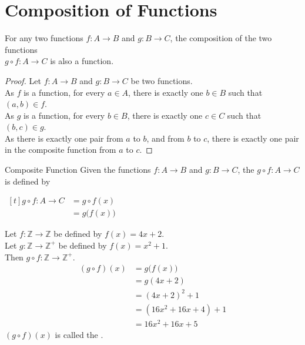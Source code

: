 \documentclass[../notes.tex]{subfiles}
\begin{document}
		\section{Composition of Functions}
				\begin{theorem}
					For any two functions $f: A \rightarrow B$ and $g: B \rightarrow C$, the composition of the two functions\\
						$g \circ f: A \rightarrow C$ is also a function.
						\begin{proof}
							Let $f: A \rightarrow B$ and $g: B \rightarrow C$ be two functions.\\
							As $f$ is a function, for every $a \in A$, there is exactly one $b \in B$ such that $(a, b) \in f$.\\
							As $g$ is a function, for every $b \in B$, there is exactly one $c \in C$ such that $(b, c) \in g$.\\
							As there is exactly one pair from $a$ to $b$, and from $b$ to $c$, there is exactly one pair in the composite function from $a$ to $c$.
						\end{proof}
				\end{theorem}
				\begin{definition}{Composite Function}
					Given the functions $f: A \rightarrow B$ and $g: B \rightarrow C$, the  $g \circ f: A \rightarrow C$ is defined by
					\centerline{$ \begin{aligned}[t]
						g \circ f: A \rightarrow C &= g \circ f(x)\\
						&= g\bigl(f(x)\bigr)
					\end{aligned} $}
				\end{definition}
			\begin{example}
				Let $f: \mathbb{Z} \rightarrow \mathbb{Z}$ be defined by $f(x) = 4x + 2$.\\
				Let $g: \mathbb{Z} \rightarrow \mathbb{Z}^{+}$ be defined by $f(x) = x^{2} + 1$.\\
				Then $g \circ f: \mathbb{Z} \rightarrow \mathbb{Z}^{+}$.
				\begin{align*}
					(g \circ f)(x) &= g\bigl(f(x)\bigr)\\
					&= g(4x + 2)\\
					&= (4x + 2)^{2} + 1\\
					&= \left(16x^{2} + 16x + 4\right) + 1\\
					&= 16x^{2} + 16x + 5
				\end{align*}
				$(g \circ f)(x)$ is called the .
			\end{example}
\end{document}
